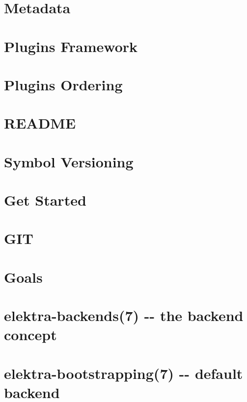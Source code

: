 \documentclass[twoside]{book}
\newcommand{\+}{\discretionary{\mbox{\scriptsize$\hookleftarrow$}}{}{}}
\begin{document}
\chapter{Metadata}
\label{doc_dev_metadata_md}

\chapter{Plugins Framework}
\label{doc_dev_plugins-framework_md}

\chapter{Plugins Ordering}
\label{doc_dev_plugins-ordering_md}

\chapter{R\+E\+A\+D\+ME}
\label{md_doc_dev_README}

\chapter{Symbol Versioning}
\label{doc_dev_symbol-versioning_md}

\chapter{Get Started}
\label{doc_GETSTARTED_md}

\chapter{G\+IT}
\label{doc_GIT_md}

\chapter{Goals}
\label{doc_GOALS_md}

\chapter{elektra-\/backends(7) -\/-\/ the backend concept}
\label{doc_help_elektra-backends_md}

\chapter{elektra-\/bootstrapping(7) -\/-\/ default backend}
\label{doc_help_elektra-bootstrapping_md}

\end{document}
